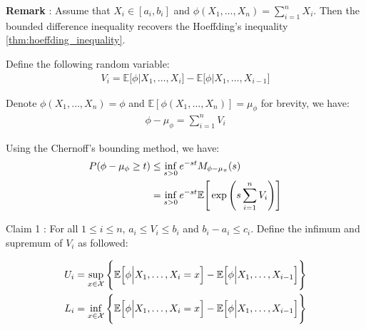 \noindent\textbf{Remark} : Assume that $X_i\in[a_i, b_i]$ and $\phi(X_1, \dots, X_n)=\sum_{i=1}^n X_i$. Then the bounded difference inequality recovers the Hoeffding's inequality \ref{thm:hoeffding_inequality}.

\begin{proof*}
    Define the following random variable:
    \begin{align*}
        V_i = \mathbb{E}\Big[\phi\Big|X_1, \dots, X_i\Big] - \mathbb{E}\Big[\phi\Big|X_1, \dots, X_{i-1}\Big]
    \end{align*}

    \noindent Denote $\phi(X_1, \dots, X_n)=\phi$ and $\mathbb{E}[\phi(X_1, \dots, X_n)] = \mu_\phi$ for brevity, we have:
    \begin{align*}
        \phi - \mu_\phi = \sum_{i=1}^n V_i
    \end{align*}

    \noindent Using the Chernoff's bounding method, we have:
    \begin{align*}
        P(\phi - \mu_\phi \ge t) 
            &\le \inf_{s>0}e^{-st}M_{\phi-\mu_\pi}(s) \\
            &= \inf_{s>0}e^{-st}\mathbb{E}\Bigg[ 
                \exp\Bigg( 
                    s\sum_{i=1}^n V_i
                 \Bigg)
             \Bigg]
    \end{align*}

    \begin{subproof}{\newline Claim 1 : For all $1\le i\le n$, $a_i\le V_i \le b_i$ and $b_i-a_i\le c_i$.}
        Define the infimum and supremum of $V_i$ as followed:

        \begin{align*}
            U_i &= \sup_{x\in\mathcal{X}}\Bigg\{ 
                \mathbb{E}\Big[ \phi \Big| X_1, \dots, X_i=x \Big] - \mathbb{E}\Big[ \phi\Big|X_1, \dots, X_{i-1} \Big]
             \Bigg\} \\
            L_i &= \inf_{x\in\mathcal{X}}\Bigg\{ 
                \mathbb{E}\Big[ \phi \Big| X_1, \dots, X_i=x \Big] - \mathbb{E}\Big[ \phi\Big|X_1, \dots, X_{i-1} \Big]
             \Bigg\}
        \end{align*}


\end{subproof}
\end{proof*}
